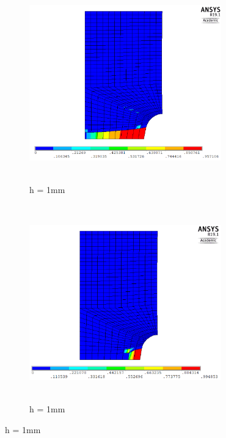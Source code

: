 \documentclass[a4paper,12pt,twoside]{report}
\begin{document}
\begin{figure}[htbp!]
       \captionsetup[subfigure]{justification=centering}
     \begin{subfigure}{0.4\textwidth}
         \includegraphics[width=8.3cm,height=8.5cm,keepaspectratio]{25.d1-1-r.png}
         \caption{h = 1mm}
         \label{fig:d1-1-r}
     \end{subfigure}
    \hspace{1.8cm}
     \captionsetup[subfigure]{justification=centering}
     \begin{subfigure}{0.4\textwidth}
         \includegraphics[width=8.3cm,height=8.5cm,keepaspectratio]{25.d1-1-nr.png}
         \caption{h = 1mm}
         \label{fig:d1-1-nr}
     \end{subfigure}
\end{figure}
\FloatBarrier
\end{document}
